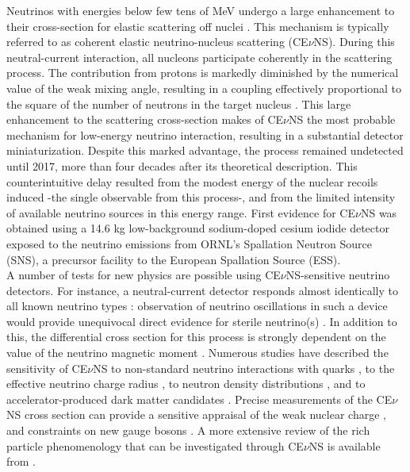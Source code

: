 \documentclass[12pt]{article}
\begin{document}
Neutrinos with energies below few tens of MeV  undergo a large enhancement to their cross-section for  elastic scattering off nuclei \cite{freedman,leo}. This mechanism is typically referred to as coherent elastic neutrino-nucleus scattering (CE$\nu$NS). During this neutral-current interaction, all nucleons participate coherently in the scattering process. The contribution from protons is markedly diminished by the numerical value of the weak mixing angle, resulting in a coupling effectively proportional to the square of the number of neutrons in the target nucleus \cite{leo}. This large enhancement to the scattering cross-section makes of CE$\nu$NS the  most probable mechanism for low-energy neutrino interaction, resulting in a substantial  detector miniaturization. Despite this marked advantage, the process remained undetected until 2017, more than four decades after its theoretical description. This counterintuitive delay resulted from the modest energy of the nuclear recoils induced -the single observable from this process-, and from the limited intensity of available neutrino sources in this energy range. First  evidence for CE$\nu$NS \cite{science,bjorn} was obtained using a 14.6 kg low-background sodium-doped cesium iodide detector \cite{ournim} exposed to the neutrino emissions from ORNL's Spallation Neutron Source (SNS), a precursor facility to the European Spallation Source (ESS). \\

 A number of tests for new physics are possible using CE$\nu$NS-sensitive neutrino detectors. For instance, a neutral-current detector responds almost identically to all known neutrino types \cite{diff}: observation of neutrino oscillations in such a device 
would provide unequivocal direct evidence for sterile neutrino(s) \cite{leo}. In addition to this, the differential cross section for this process is strongly dependent on the value of the neutrino magnetic moment \cite{dodd}. Numerous  studies have described the sensitivity of CE$\nu$NS to non-standard neutrino interactions with quarks \cite{Barranco:2005yy,new2}, to the effective neutrino charge radius \cite{Bernabeu:2002pd}, to neutron density distributions  \cite{patton,patton2,nst1}, and to accelerator-produced dark matter candidates \cite{tayloe2}. Precise measurements of the CE$\nu$NS cross section can provide a sensitive appraisal of the weak nuclear charge \cite{larry}, and constraints on new gauge bosons \cite{shoemaker}. A more extensive review of the rich particle phenomenology that can be investigated through CE$\nu$NS is available from  \cite{ESS}.\\
\end{document}
